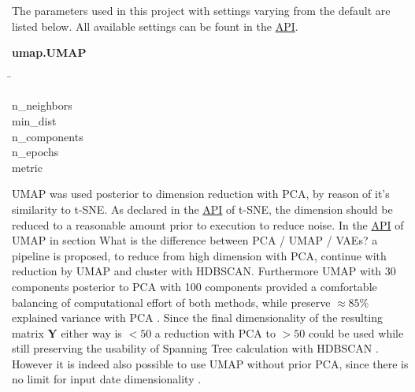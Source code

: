 The parameters used in this project with settings varying from the default are listed below. All available settings can be fount in the \href{https://umap-learn.readthedocs.io/en/latest/api.html}{API}.

\begin{leftbar}
    \textbf{umap.UMAP}
    \begin{nstabbing}
        \qquad\qquad\qquad\qquad\qquad\quad\=\kill

        n\_neighbors \\
        
        min\_dist \\
        
        n\_components \\
        
        n\_epochs \\
        
        metric 
    \end{nstabbing}
\end{leftbar}

\gls{UMAP} was used posterior to dimension reduction with \gls{PCA}, by reason of it's similarity to \gls{t-SNE}. As declared in the \href{https://scikit-learn.org/stable/modules/generated/sklearn.manifold.TSNE.html}{API} of \gls{t-SNE}, the dimension should be reduced to a reasonable amount prior to execution to reduce noise. In the \href{https://umap-learn.readthedocs.io/en/latest/api.html}{API} of \gls{UMAP} in section \glqq What is the difference between PCA / UMAP / VAEs?\grqq{} a pipeline is proposed, to reduce from high dimension with \gls{PCA}, continue with reduction by \gls{UMAP} and cluster with \gls{HDBSCAN}. Furthermore \gls{UMAP} with 30 components posterior to \gls{PCA} with 100 components provided a comfortable balancing of computational effort of both methods, while preserve $\approx 85\%$ explained variance with \gls{PCA} \autocite{mcinnes_umap_2020}. Since the final dimensionality of the resulting matrix $\mathbf{Y}$ either way is $<50$ a reduction with \gls{PCA} to $>50$ could be used while still preserving the usability of Spanning Tree calculation with \gls{HDBSCAN} \autocite{mcinnes_hdbscan_2017}. However it is indeed also possible to use \gls{UMAP} without prior \gls{PCA}, since there is no limit for input date dimensionality \autocite{mcinnes_umap_2020}. 